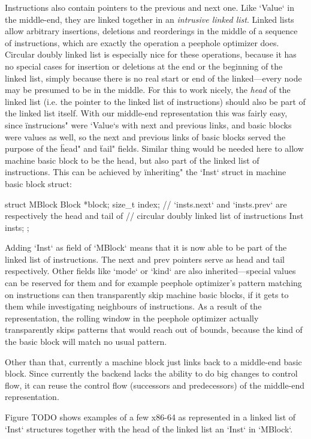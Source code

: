 Instructions also contain pointers to the previous and next one. Like `Value` in
the middle-end, they are linked together in an {\em intrusive linked list}.
Linked lists allow arbitrary insertions, deletions and reorderings in the middle
of a sequence of instructions, which are exactly the operation a peephole
optimizer does. Circular doubly linked list is especially nice for these
operations, because it has no special cases for insertion or deletions at the
end or the beginning of the linked list, simply because there is no real start
or end of the linked---every node may be presumed to be in the middle. For this
to work nicely, the {\em head} of the linked list (i.e. the pointer to the
linked list of instructions) should also be part of the linked list itself. With
our middle-end representation this was fairly easy, since \"instrucions" were
`Value`s with next and previous links, and basic blocks were values as well, so
the next and previous links of basic blocks served the purpose of the \"head"
and \"tail" fields. Similar thing would be needed here to allow machine basic
block to be the head, but also part of the linked list of instructions. This can
be achieved by \"inheriting" the `Inst` struct in machine basic block struct:

\begtt
struct MBlock {
	Block *block;
	size_t index;
	// `insts.next` and `insts.prev` are respectively the head and tail of
	// circular doubly linked list of instructions
	Inst insts;
};
\endtt

Adding `Inst` as field of `MBlock` means that it is now able to be part of the
linked list of instructions. The next and prev pointers serve as head and tail
respectively. Other fields like `mode` or `kind` are also inherited---special
values can be reserved for them and for example peephole optimizer's pattern
matching on instructions can then transparently skip machine basic blocks, if it
gets to them while investigating neighbours of instructions. As a result of the
representation, the rolling window in the peephole optimizer actually
transparently skips patterns that would reach out of bounds, because the kind of
the basic block will match no usual pattern.

Other than that, currently a machine block just links back to a middle-end basic
block. Since currently the backend lacks the ability to do big changes to
control flow, it can reuse the control flow (successors and predecessors) of the
middle-end representation.

Figure TODO shows examples of a few x86-64 as represented in a linked list of
`Inst` structures together with the head of the linked list an `Inst` in
`MBlock`.

